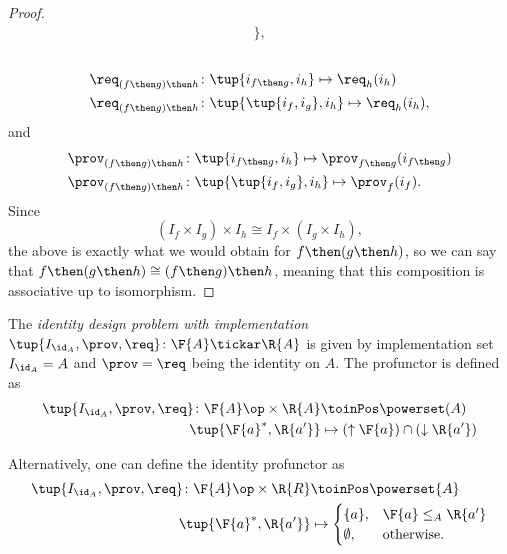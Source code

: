 \begin{proof}
\begin{equation}
\begin{aligned}
            \},
\end{aligned}
\end{equation}
~
\begin{equation}
    \begin{aligned}
    \req_{(f\then g)\then h}  &\colon  \tup{i_{f\then g},i_h} \mapsto \req_h(i_h) \\
    \req_{(f\then g)\then h}  &\colon  \tup{\tup{i_f, i_g},i_h} \mapsto \req_h(i_h),
    \end{aligned}
\end{equation}
and
\begin{equation}
    \begin{aligned}
    \prov_{(f\then g)\then h}  &\colon  \tup{i_{f\then g},i_h} \mapsto \prov_{f\then g}(i_{f\then g})\\
    \prov_{(f\then g)\then h}  &\colon  \tup{\tup{i_f, i_g},i_h} \mapsto \prov_f(i_f).
    \end{aligned}
\end{equation}
Since
\begin{equation}
    (I_f \times I_g) \times I_{h} \cong  I_f \times (I_g \times I_{h}),
\end{equation}
the above is exactly what we would obtain for $f\then (g\then h)$, so we can say
that  $f\then(g\then h)\cong (f\then g)\then h$, meaning that this composition is associative up to isomorphism.
\end{proof}

\begin{definition}
\label{def:identitydpi}
The \emph{identity design problem with implementation} $\tup{I_{\id_A},\prov,\req} \colon \F{A} \tickar \R{A}$ is given by implementation set $I_{\id_A} = A$ and $\prov=\req$ being
the identity on $A$. The profunctor is defined as
\begin{equation}
\begin{aligned}
\tup{I_{\id_A},\prov,\req} \colon \F{A}\op \times \R{A} &\toinPos \powerset(A) \\
\tup{\F{a}^*,\R{a'}} &\mapsto (\uparrow \F{a}) \cap (\downarrow \R{a'})
\end{aligned}
\end{equation}
\end{definition}
\begin{remark}
Alternatively, one can define the identity profunctor as
\begin{equation}
    \begin{aligned}
    \tup{I_{\id_A},\prov,\req}\colon \F{A}\op \times \R{R} &\toinPos \powerset{A}\\
    \tup{\F{a}^*,\R{a'}}&\mapsto
    \begin{cases}
    \{a\},&\F{a}\leq_A \R{a'}\\
    \emptyset, &\text{otherwise}.
    \end{cases}
    \end{aligned}
\end{equation}
\end{remark}

